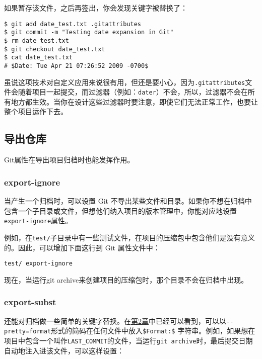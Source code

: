 \documentclass[a4paper]{book}
\newcommand{\prechap}{第}
\newcommand{\postchap}{章}
\newcommand{\chapref}[1]{\hyperref[chap:#1]{\prechap #1\postchap}}
\begin{document}
如果暂存该文件，之后再签出，你会发现关键字被替换了：

\begin{shaded}\begin{verbatim}
$ git add date_test.txt .gitattributes
$ git commit -m "Testing date expansion in Git"
$ rm date_test.txt
$ git checkout date_test.txt
$ cat date_test.txt
# $Date: Tue Apr 21 07:26:52 2009 -0700$
\end{verbatim}\end{shaded}

虽说这项技术对自定义应用来说很有用，但还是要小心，因为\texttt{.gitattributes}文件会随着项目一起提交，而过滤器（例如：\texttt{dater}）不会，所以，过滤器不会在所有地方都生效。当你在设计这些过滤器时要注意，即使它们无法正常工作，也要让整个项目运作下去。

\subsection{导出仓库}

Git属性在导出项目归档时也能发挥作用。

\subsubsection{export-ignore}

当产生一个归档时，可以设置 Git 不导出某些文件和目录。如果你不想在归档中包含一个子目录或文件，但想他们纳入项目的版本管理中，你能对应地设置\texttt{export-ignore}属性。

例如，在\texttt{test/}子目录中有一些测试文件，在项目的压缩包中包含他们是没有意义的。因此，可以增加下面这行到 Git 属性文件中：

\begin{shaded}\begin{verbatim}
test/ export-ignore
\end{verbatim}\end{shaded}

现在，当运行git archive来创建项目的压缩包时，那个目录不会在归档中出现。

\subsubsection{export-subst}

还能对归档做一些简单的关键字替换。在\chapref{2}中已经可以看到，可以以\texttt{-{}-pretty=format}形式的简码在任何文件中放入\texttt{\$Format:\$} 字符串。例如，如果想在项目中包含一个叫作\texttt{LAST\_COMMIT}的文件，当运行\texttt{git archive}时，最后提交日期自动地注入进该文件，可以这样设置：
\end{document}
